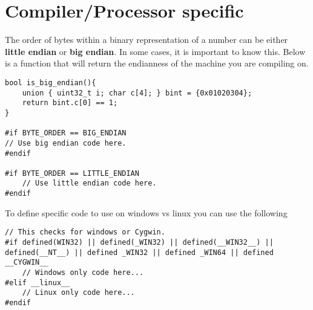 \section{Compiler/Processor specific}
The order of bytes within a binary representation of a number can be either \textbf{little endian} or \textbf{big endian}. In some cases, it is important to know this. Below is a function that will return the endianness of the machine you are compiling on.
\begin{lstlisting}
bool is_big_endian(){
	union { uint32_t i; char c[4]; } bint = {0x01020304};
	return bint.c[0] == 1;
}

#if BYTE_ORDER == BIG_ENDIAN
// Use big endian code here.
#endif

#if BYTE_ORDER == LITTLE_ENDIAN
	// Use little endian code here.
#endif
\end{lstlisting}

To define specific code to use on windows vs linux you can use the following
\begin{lstlisting}
// This checks for windows or Cygwin.
#if defined(WIN32) || defined(_WIN32) || defined(__WIN32__) || defined(__NT__) || defined _WIN32 || defined _WIN64 || defined __CYGWIN__
	// Windows only code here...
#elif __linux__
	// Linux only code here...
#endif
\end{lstlisting}





